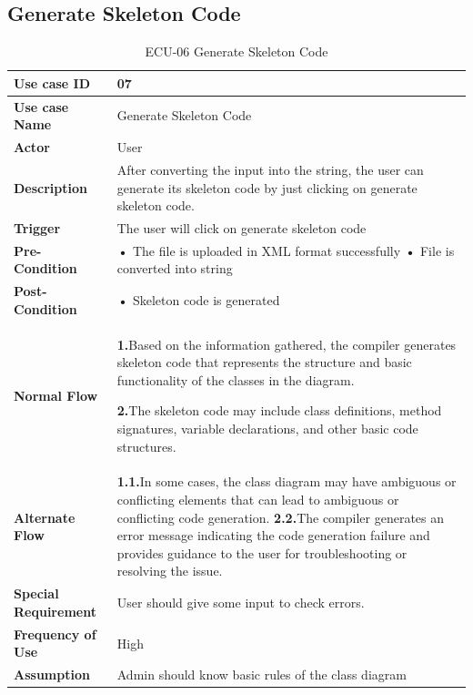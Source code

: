 \documentclass[12pt,a4paper]{article}
\begin{document}
    
  \clearpage  
    \subsection{Generate Skeleton Code}
    \begin{table}[h!]
\caption{ECU-06 Generate Skeleton Code}
    \centering
    \begin{tabular}{|l|p{10cm}|}
    \hline
       \textbf{Use case ID}&07 \\ %
       \hline
       \textbf{Use case Name}&Generate Skeleton Code \\ %
       \hline
       \textbf{Actor}&User \\ %
       \hline
       \textbf{Description}&After converting the input into the string, the user can generate its skeleton code by just clicking on generate skeleton code.\\ %
        \hline
       \textbf{Trigger}&The user will click on generate skeleton code \\ %
        \hline
       \textbf{Pre-Condition}&
\textbf• The file is uploaded in XML format successfully
\newline\textbf• File is converted into string\\ %
        \hline
       \textbf{Post-Condition}&\textbf• Skeleton code is generated
 \\ %
        \hline
       \textbf{Normal Flow}&
    \textbf{1.}Based on the information gathered, the compiler generates skeleton code that represents the structure and basic functionality of the classes in the diagram.

\newline\textbf{2.}The skeleton code may include class definitions, method signatures, variable declarations, and other basic code structures.
\\ %
\hline
       \textbf{Alternate Flow}&
       \textbf{1.1.}In some cases, the class diagram may have ambiguous or conflicting elements that can lead to ambiguous or conflicting code generation.
\newline\textbf{2.2.}The compiler generates an error message indicating the code generation failure and provides guidance to the user for troubleshooting or resolving the issue.\\ %
        \hline
       \textbf{Special Requirement}&User should give some input to check errors. \\ %
        \hline
       \textbf{Frequency of Use}&High \\ %
        \hline
       \textbf{Assumption}&Admin should know basic rules of the class diagram\\ %
       \hline
    \end{tabular} 
    \end{table}
\end{document}
